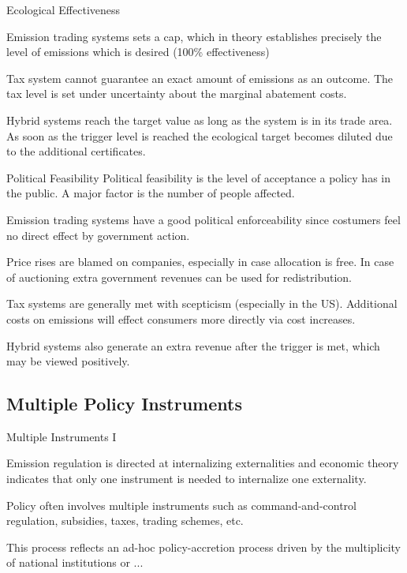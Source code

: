 {Ecological Effectiveness}


	Emission trading systems sets a cap, which in theory establishes precisely the level of emissions which is desired (100\% effectiveness)

	Tax system cannot guarantee an exact amount of emissions as an  outcome. The tax level is set under uncertainty about the marginal abatement costs.

	Hybrid systems reach the target value as long as the system is in its trade area. As soon as the trigger level is reached the ecological target becomes diluted due to the additional certificates.


{Political Feasibility}
Political feasibility is the level of acceptance a policy has in the public. A major factor is the number of people affected.


	Emission trading systems have a good political enforceability since costumers feel no direct effect by government action.

	Price rises are blamed on companies, especially in case allocation is free. In case of auctioning extra government revenues can be used for redistribution.

	Tax systems are generally met with scepticism (especially in the US). Additional costs on emissions will effect consumers more directly via cost increases.

	Hybrid systems also generate an extra revenue after the trigger is met, which may be viewed positively.


\subsection{Multiple Policy Instruments}

{Multiple Instruments I}


	Emission regulation is directed at internalizing externalities and economic theory indicates that only one instrument is needed to
internalize one externality.

	Policy often involves multiple instruments such as command-and-control regulation, subsidies, taxes, trading schemes, etc.

	This process reflects an ad-hoc policy-accretion process driven by the multiplicity of national institutions or ...

